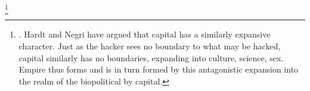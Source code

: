 \footnote{\cite[076]{wark:2004hm}. Hardt and Negri have argued that capital has a similarly expansive character. Just as the hacker sees no boundary to what may be hacked, capital similarly has no boundaries, expanding into culture, science, sex. Empire thus forms and is in turn formed by this antagonistic expansion into the realm of the biopolitical by capital.}